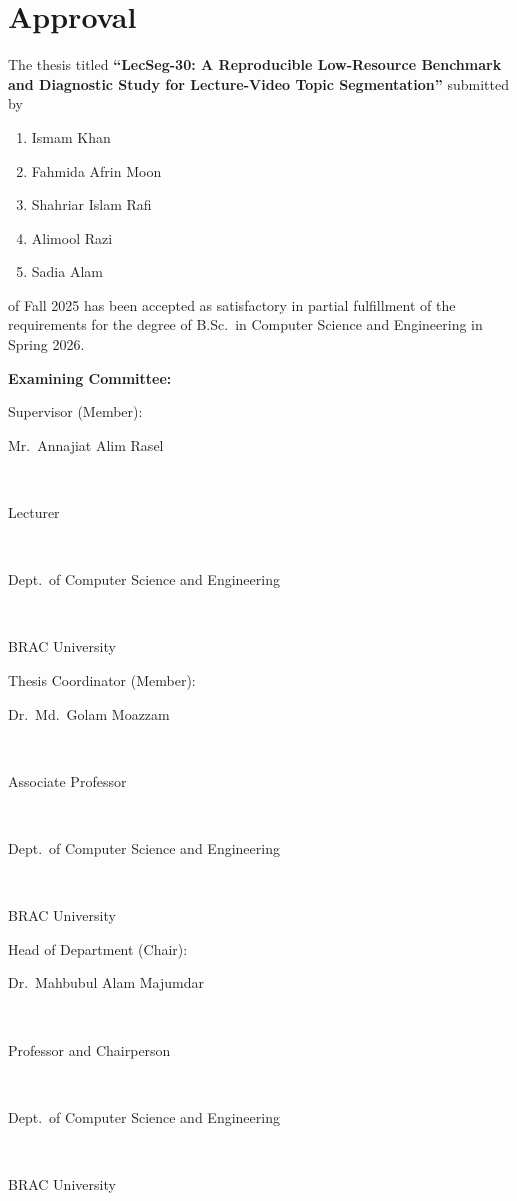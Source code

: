 \renewcommand*\wildcard[2][6cm]{\vspace{2cm}\parbox{#1}{\hrulefill\par #2}}

\section*{Approval}

The thesis titled \textbf{``LecSeg-30: A Reproducible Low-Resource Benchmark and Diagnostic Study for Lecture-Video Topic Segmentation''} submitted by

\begin{enumerate}
  \item Ismam Khan
  \item Fahmida Afrin Moon
  \item Shahriar Islam Rafi
  \item Alimool Razi
  \item Sadia Alam
\end{enumerate}

of Fall 2025 has been accepted as satisfactory in partial fulfillment of the requirements for the degree of B.Sc.\ in Computer Science and Engineering in Spring 2026.

\vspace{0.5cm}
\textbf{Examining Committee:}

\vspace{0.5cm}
Supervisor (Member):
\begin{center}
  \hspace{5cm}
  \wildcard{\centerline{Mr.\ Annajiat Alim Rasel} ~\\
            \centerline{Lecturer} ~\\
            \centerline{Dept.\ of Computer Science and Engineering} ~\\
            \centerline{BRAC University}}
\end{center}

Thesis Coordinator (Member):
\begin{center}
  \hspace{5cm}
  \wildcard{\centerline{Dr.\ Md.\ Golam Moazzam} ~\\
            \centerline{Associate Professor} ~\\
            \centerline{Dept.\ of Computer Science and Engineering} ~\\
            \centerline{BRAC University}}
\end{center}

Head of Department (Chair):
\begin{center}
  \hspace{5cm}
  \wildcard{\centerline{Dr.\ Mahbubul Alam Majumdar} ~\\
            \centerline{Professor and Chairperson} ~\\
            \centerline{Dept.\ of Computer Science and Engineering} ~\\
            \centerline{BRAC University}}
\end{center}

\pagebreak
